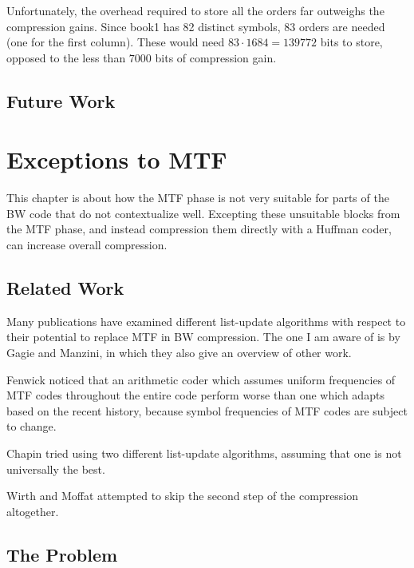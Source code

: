 \documentclass[a4paper]{scrreprt}
\begin{document}
Unfortunately, the overhead required to store all the orders far outweighs the
compression gains. Since book1 has 82 distinct symbols, 83 orders are needed
(one for the first column). These would need \(83 \cdot 1684 = 139772\) bits to
store, opposed to the less than \(7000\) bits of compression gain.

\section{Future Work}


\chapter{Exceptions to MTF}

This chapter is about how the MTF phase is not very suitable for parts of the BW
code that do not contextualize well. Excepting these unsuitable blocks from the
MTF phase, and instead compression them directly with a Huffman coder, can
increase overall compression.

\section{Related Work}

Many publications have examined different list-update algorithms with respect to
their potential to replace MTF in BW compression. The one I am aware of is by
Gagie and Manzini\cite{gagie2007listupdate}, in which they also give an overview
of other work.

Fenwick\cite{fenwick1996block} noticed that an arithmetic coder which assumes
uniform frequencies of MTF codes throughout the entire code perform worse than
one which adapts based on the recent history, because symbol frequencies of MTF
codes are subject to change.

Chapin\cite{chapin2000switching,chapin2001diss} tried using two different
list-update algorithms, assuming that one is not universally the best.

Wirth and Moffat\cite{wirth2001ranks} attempted to skip the second step of the
compression altogether.

\section{The Problem}
\end{document}
